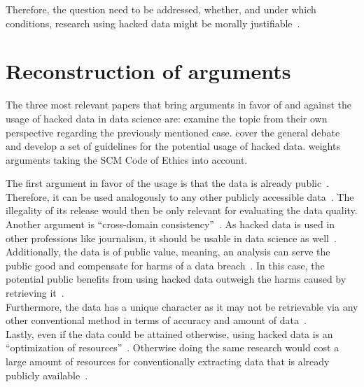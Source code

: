 Therefore, the question need to be addressed, whether, and under which conditions, research using hacked data might be morally justifiable~\parencite[][745]{nature}.

\section*{Reconstruction of arguments}

The three most relevant papers that bring arguments in favor of and against the usage of hacked data in data science are:
\textcite{patreon} examine the topic from their own perspective regarding the previously mentioned case.
\textcite{nature} cover the general debate and develop a set of guidelines for the potential usage of hacked data.
\textcite{acm} weights arguments taking the SCM Code of Ethics into account.

The first argument in favor of the usage is that the data is already public~\parencite[][5]{patreon}.
Therefore, it can be used analogously to any other publicly accessible data~\parencite[][23]{acm}.
The illegality of its release would then be only relevant for evaluating the data quality.\\
Another argument is ``cross-domain consistency''~\parencite[][746]{nature}.
As hacked data is used in other professions like journalism, it should be usable in data science as well~\parencite[][745]{nature}.\\
Additionally, the data is of public value, meaning, an analysis can serve the public good and compensate for harms of a data breach~\parencites[][5]{patreon}[][23]{acm}.
In this case, the potential public benefits from using hacked data outweigh the harms caused by retrieving it~\parencite[][23]{acm}.\\
Furthermore, the data has a unique character as it may not be retrievable via any other conventional method in terms of accuracy and amount of data~\parencites[][745]{nature}[][5]{patreon}.\\
Lastly, even if the data could be attained otherwise, using hacked data is an ``optimization of resources''~\parencite[][746]{nature}.
Otherwise doing the same research would cost a large amount of resources for conventionally extracting data that is already publicly available~\parencite[][745]{nature}.

